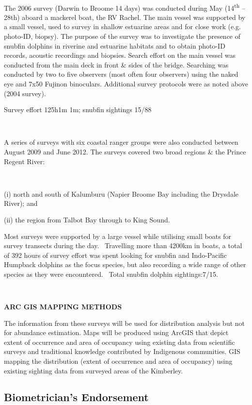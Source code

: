 \documentclass[version=last,
    paper=a4,                               %
    10pt,                                   %
    dvipsnames,
    oneside,                              %
    headings=openany,                       %
    open=any,
    BCOR=7mm,                               %
    DIV=15,     %
]{scrbook}
\begin{document}
~

The 2006 survey (Darwin to Broome 14 days) was conducted during May
(14\textsuperscript{th} -- 28th) aboard a mackerel boat, the RV Rachel.
The main vessel was supported by a small vessel, used to survey in
shallow estuarine areas and for close work (e.g. photo-ID, biopsy). The
purpose of the survey was to investigate the presence of snubfin
dolphins in riverine and estuarine habitats and to obtain photo-ID
records, acoustic recordings and biopsies. Search effort on the main
vessel was conducted from the main deck in front \& sides of the bridge.
Searching was conducted by two to five observers (most often four
observers) using the naked eye and 7x50 Fujinon binoculars. Additional
survey protocols were as noted above (2004 survey).

Survey effort 125h1m 1m; snubfin sightings 15/88

~

A series of surveys with six coastal ranger groups were also conducted
between August 2009 and June 2012. The surveys covered two broad regions
\& the Prince Regent River:

~

(i) north and south of Kalumburu (Napier Broome Bay including the
Drysdale River); and

(ii) the region from Talbot Bay through to King Sound.

Most surveys were supported by a large vessel while utilising small
boats for survey transects during the day.~ Travelling more than 4200km
in boats, a total of 392 hours of survey effort was spent looking for
snubfin and Indo-Pacific Humpback dolphins as the focus species, but
also recording a wide range of other species as they were encountered.
~Total snubfin dolphin sightings:7/15.

~

\textbf{ARC GIS MAPPING METHODS}

The information from these surveys will be used for distribution
analysis but not for abundance estimation. Maps will be produced using
ArcGIS that depict extent of occurrence and area of occupancy using
existing data from scientific surveys and traditional knowledge
contributed by Indigenous communities. GIS mapping the distribution
(extent of occurrence and area of occupancy) using existing sighting
data from surveyed areas of the Kimberley.~




\subsection*{Biometrician's Endorsement}
\end{document}
